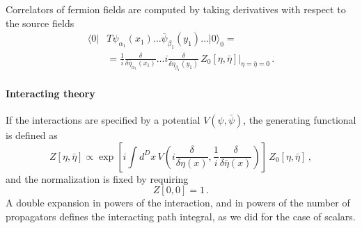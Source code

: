 \documentclass[notes]{subfiles}
\renewcommand{\psibar}{\bar{\psi}}
\renewcommand{\etabar}{\bar{\eta}}
\begin{document}
Correlators of fermion fields are computed by taking derivatives with
respect to the source fields
\begin{align}
  \langle 0 |& T \psi_{\alpha_1}(x_1) \ldots \psibar_{\beta_1}(y_1)
  \ldots |0\rangle_0  = \nonumber \\
   &=\frac{1}{i} \frac{\delta}{\delta\etabar_{\alpha_1}(x_1)} \ldots
  i \frac{\delta}{\delta\eta_{\beta_1}(y_1)}\, 
  \left. Z_0\left[\eta, \etabar\right] \right|_{\eta=\etabar=0}\, .
\end{align}

\paragraph{Interacting theory}

If the interactions are specified by a potential
$V\left(\psi,\psibar\right)$, the generating functional is defined as 
\begin{equation}
  \label{eq:InterGenFunc}
  Z\left[\eta,\etabar\right] \propto
  \exp\left[
    i \int d^Dx\, V\left( i \frac{\delta}{\delta\eta(x)}, 
    \frac{1}{i} \frac{\delta}{\delta\etabar(x)}\right)
  \right] \, 
  Z_0\left[\eta, \etabar \right]\, , 
\end{equation}
and the normalization is fixed by requiring
\begin{equation}
  \label{eq:ZNorm}
  Z[0,0] = 1\, .
\end{equation}
A double expansion in powers of the interaction, and in powers of the
number of propagators defines the interacting path integral, as we did
for the case of scalars. 
\end{document}
